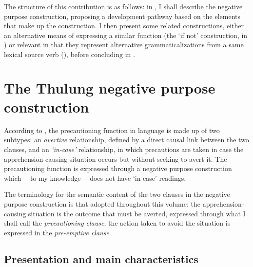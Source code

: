 \documentclass[output=paper,colorlinks,citecolor=brown]{langscibook}
\begin{document}
The structure of this contribution is as follows: in , I shall describe the  negative purpose construction, proposing a development pathway based on the elements that make up the construction. I then present some related constructions, either an alternative means of expressing a similar function (the `if not' construction, in ) or relevant in that they represent alternative grammaticalizations from a same lexical source verb (), before concluding in .


\section{The Thulung negative purpose construction}
\label{sec:Tnegpur}

According to \citet[302]{lichtenberk1995}, the precautioning function in language is made up of two subtypes: an \textit{avertive} relationship, defined by a direct causal link between the two clauses, and an \textit{`in-case'} relationship, in which precautions are taken in case the apprehension\hyp causing situation occurs but without seeking to avert it. The precautioning function is expressed through a negative purpose construction which~-- to my knowledge~-- does not have `in-case' readings.

The terminology for the semantic content of the two clauses in the negative purpose construction is that adopted throughout this volume: the apprehension-causing situation is the outcome that must be averted, expressed through what I shall call the \textit{precautioning clause}; the action taken to avoid the situation is expressed in the \textit{pre-emptive clause}. 



\subsection{Presentation and main characteristics}
\label{subsec:presentation}
\end{document}
